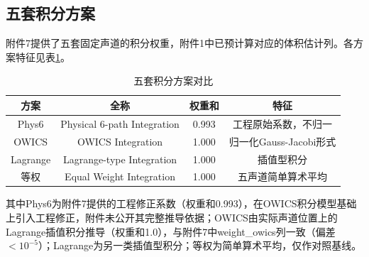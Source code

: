 \subsection{五套积分方案}

附件7提供了五套固定声道的积分权重，附件1中已预计算对应的体积估计列。各方案特征见表\ref{tab:five_methods}。

\begin{table}[H]
\centering
\caption{五套积分方案对比}
\label{tab:five_methods}
\begin{tabular}{cccc}
\toprule
方案 & 全称 & 权重和 & 特征 \\
\midrule
Phys6 & Physical 6-path Integration & 0.993 & 工程原始系数，不归一 \\
OWICS & OWICS Integration & 1.000 & 归一化Gauss-Jacobi形式 \\
Lagrange & Lagrange-type Integration & 1.000 & 插值型积分 \\
等权 & Equal Weight Integration & 1.000 & 五声道简单算术平均 \\
\bottomrule
\end{tabular}
\end{table}

其中Phys6为附件7提供的工程修正系数（权重和0.993），在OWICS积分模型基础上引入工程修正，附件未公开其完整推导依据；OWICS由实际声道位置上的Lagrange插值积分推导（权重和1.0），与附件7中weight\_owics列一致（偏差$<10^{-5}$）；Lagrange为另一类插值型积分；等权为简单算术平均，仅作对照基线。
